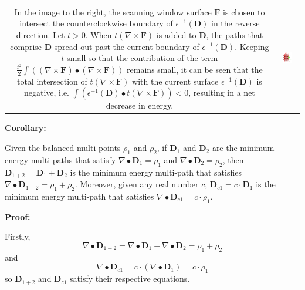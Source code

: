 \begin{tabular}{cc}
\parbox{0.5\textwidth}{
In the image to the right, the scanning window surface \(\mathbf{F}\) is chosen to intersect the counterclockwise boundary of \(\epsilon^{-1}(\mathbf{D})\) in the reverse direction. Let \(t > 0\). When \(t(\nabla \times \mathbf{F})\) is added to \(\mathbf{D}\), the paths that comprise \(\mathbf{D}\) spread out past the current boundary of \(\epsilon^{-1}(\mathbf{D})\). Keeping \(t\) small so that the contribution of the term \(\frac{t^2}{2}\int ((\nabla \times \mathbf{F}) \bullet (\nabla \times \mathbf{F}))\) remains small, it can be seen that the total intersection of \(t(\nabla \times \mathbf{F})\) with the current surface \(\epsilon^{-1}(\mathbf{D})\) is negative, i.e. \(\int (\epsilon^{-1}(\mathbf{D}) \bullet t(\nabla \times \mathbf{F})) < 0\), resulting in a net decrease in energy.
} & \parbox{0.5\textwidth}{
\includegraphics[width = 0.5\textwidth]{Duality/minimizing_path_energy}
}
\end{tabular}


\textbf{Corollary:}

Given the balanced multi-points \(\rho_1\) and \(\rho_2\), if \(\mathbf{D}_1\) and \(\mathbf{D}_2\) are the minimum energy multi-paths that satisfy \(\nabla \bullet \mathbf{D}_1 = \rho_1\) and \(\nabla \bullet \mathbf{D}_2 = \rho_2\), then \(\mathbf{D}_{1+2} = \mathbf{D}_1 + \mathbf{D}_2\) is the minimum energy multi-path that satisfies \(\nabla \bullet \mathbf{D}_{1+2} = \rho_1 + \rho_2\). Moreover, given any real number \(c\), \(\mathbf{D}_{c1} = c \cdot \mathbf{D}_1\) is the minimum energy multi-path that satisfies \(\nabla \bullet \mathbf{D}_{c1} = c \cdot \rho_1\).

\textbf{Proof:}

Firstly, 
\[\nabla \bullet \mathbf{D}_{1+2} = \nabla \bullet \mathbf{D}_1 + \nabla \bullet \mathbf{D}_2 = \rho_1 + \rho_2\]
and 
\[\nabla \bullet \mathbf{D}_{c1} = c \cdot (\nabla \bullet \mathbf{D}_1) = c \cdot \rho_1\]
so \(\mathbf{D}_{1+2}\) and \(\mathbf{D}_{c1}\) satisfy their respective equations.

